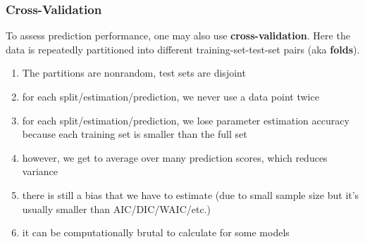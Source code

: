 \documentclass{beamer}
\begin{document}




\begin{frame}
\frametitle{Cross-Validation}

To assess prediction performance, one may also use {\bf cross-validation}. Here the data is repeatedly partitioned into different training-set-test-set pairs (aka {\bf folds}).
\pause

\begin{enumerate}
\item The partitions are nonrandom, test sets are disjoint
\item for each split/estimation/prediction, we never use a data point twice
\item for each split/estimation/prediction, we lose parameter estimation accuracy because each training set is smaller than the full set
\item however, we get to average over many prediction scores, which reduces variance
\item there is still a bias that we have to estimate (due to small
  sample size but it's usually smaller than AIC/DIC/WAIC/etc.)
\item it can be computationally brutal to calculate for some models
\end{enumerate}



\end{frame}
\end{document}
